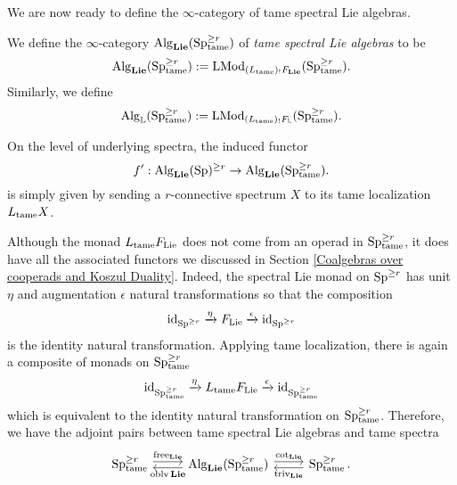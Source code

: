 We are now ready to define the $\infty$-category of tame spectral Lie algebras.
\begin{definition}
\label{Def of tame spectral Lie algebras}
    We define the $\infty$-category $\operatorname{Alg}_{\mathbf{Lie}}(\operatorname{Sp}^{\geq r}_{\operatorname{\operatorname{tame}}})$ of \emph{tame spectral Lie algebras} to be 
    $$
    \operatorname{Alg}_{\mathbf{Lie}}(\operatorname{Sp}^{\geq r}_{\operatorname{\operatorname{tame}}}) := \operatorname{LMod}_{	(L_{\operatorname{\operatorname{tame}}})_{!}F_{\mathbf{Lie}}}(\operatorname{Sp}^{\geq r}_{\operatorname{\operatorname{tame}}}).
    $$
    Similarly, we define 
    $$
    \operatorname{Alg}_{{\mathbb{L}}}(\operatorname{Sp}^{\geq r}_{\operatorname{\operatorname{tame}}}) := \operatorname{LMod}_{	(L_{\operatorname{\operatorname{tame}}})_{!}F_{{\mathbb{L}}}}(\operatorname{Sp}^{\geq r}_{\operatorname{\operatorname{tame}}}).
    $$
\end{definition}

On the level of underlying spectra,
the induced functor 
$$
f': \operatorname{Alg}_{\mathbf{Lie}}(\operatorname{Sp})^{\geq r} 
\to 
\operatorname{Alg}_{\mathbf{Lie}}(\operatorname{Sp}^{\geq r}_{\operatorname{\operatorname{tame}}}).
$$
is simply given by sending a $r$-connective spectrum $X$ to its tame localization $L_{\operatorname{\operatorname{tame}}}X$.

\begin{remark}
Although the monad $L_{\operatorname{\operatorname{tame}}}F_{\operatorname{Lie}}$ does not come from an operad in $\operatorname{Sp}^{\geq r}_{\operatorname{\operatorname{tame}}}$, it does have all the associated functors we discussed in Section \ref{Coalgebras over cooperads and Koszul Duality}.
Indeed, the spectral Lie monad on $\operatorname{Sp}^{\geq r}$ has unit $\eta$ and augmentation $\epsilon$ natural transformations so that the composition 
\[
\operatorname{id}_{\operatorname{Sp}^{\geq r}}
\xrightarrow{\eta}
F_{\operatorname{Lie}}\xrightarrow{\epsilon}
\operatorname{id}_{\operatorname{Sp}^{\geq r}}
\]
is the identity natural transformation.
Applying tame localization, there is again a composite of monads on $\operatorname{Sp}^{\geq r}_{\operatorname{\operatorname{tame}}}$
\[
\operatorname{id}_{\operatorname{Sp}^{\geq r}_{\operatorname{\operatorname{tame}}}}
\xrightarrow{\eta}
L_{\operatorname{\operatorname{tame}}}F_{\operatorname{Lie}}\xrightarrow{\epsilon}
\operatorname{id}_{\operatorname{Sp}^{\geq r}_{\operatorname{\operatorname{tame}}}}
\]
which is equivalent to the identity natural transformation on $\operatorname{Sp}^{\geq r}_{\operatorname{\operatorname{tame}}}$.
Therefore, we have the adjoint pairs between tame spectral Lie algebras and tame spectra
\[
\begin{tikzcd}
\Sp^{\geq r}_{\tame} & \Alg_{\spLie}(\Sp^{\geq r}_{\tame}) & \Sp^{\geq r}_{\tame}
	\arrow[from=1-1, to= 1-2, shift left = 1, "\Free_{\spLie}" above]
	\arrow[from=1-2, to=1-1, shift left = 1, "\oblv{\spLie}" below]
	\arrow[from=1-2, to= 1-3, shift left = 1, "\cot_{\spLie}" above]
	\arrow[from=1-3, to=1-2, shift left = 1, "\trivial_{\spLie}" below].
\end{tikzcd}
\]
\end{remark}

